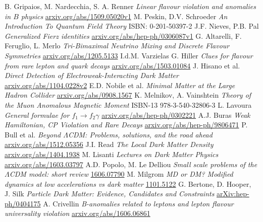 \begin{thebibliography}{xxx}
 B. Gripaios, M. Nardecchia, S. A. Renner \textit{Linear flavour violation and anomalies in $B$ physics} \href{http://arxiv.org/abs/1509.05020v1}{arxiv.org/abs/1509.05020v1}
 M. Peskin, D.V. Schroeder \textit{An Introduction To Quantum Field Theory} ISBN: 0-201-50397-2
 J.F. Nieves, P.B. Pal \textit{Generalized Fierz identities} \href{http://arxiv.org/abs/hep-ph/0306087v1}{arxiv.org/abs/hep-ph/0306087v1}
 G. Altarelli, F. Feruglio, L. Merlo \textit{Tri-Bimaximal Neutrino Mixing and Discrete Flavour Symmetries} \href{https://arxiv.org/abs/1205.5133}{arxiv.org/abs/1205.5133}
 I.d.M. Varzielas G. Hiller \textit{Clues for flavour from rare lepton and quark decays} \href{https://arxiv.org/abs/1503.01084}{arxiv.org/abs/1503.01084}
 J. Hisano et al. \textit{Direct Detection of Electroweak-Interacting Dark Matter} \href{https://arxiv.org/abs/1104.0228v2}{arxiv.org/abs/1104.0228v2}
 E.D. Nobile et al. \textit{Minimal Matter at the Large Hadron Collider} \href{http://arxiv.org/abs/0908.1567}{arxiv.org/abs/0908.1567}
 K. Melnikov, A. Vainshtein \textit{Theory of the Muon Anomalous Magnetic Moment} ISBN-13 978-3-540-32806-3
 L. Lavoura \textit{General formulae for $f_1\rightarrow f_2 \gamma$} \href{http://arxiv.org/abs/hep-ph/0302221}{arxiv.org/abs/hep-ph/0302221}
 A.J. Buras \textit{Weak Hamiltonian, CP Violation and Rare Decays} \href{http://arxiv.org/abs/hep-ph/9806471}{arxiv.org/abs/hep-ph/9806471}
 P. Bull et al. \textit{Beyond $\Lambda$CDM: Problems, solutions, and the road ahead} \href{http://arxiv.org/abs/1512.05356}{arxiv.org/abs/1512.05356}
 J.I. Read \textit{The Local Dark Matter Density} \href{http://arxiv.org/abs/1404.1938}{arxiv.org/abs/1404.1938}
 M. Lisanti \textit{Lectures on Dark Matter Physics} \href{https://arxiv.org/abs/1603.03797}{arxiv.org/abs/1603.03797}
 A.D. Popolo, M. Le Delliou \textit{Small scale problems of the $\Lambda$CDM model: short review} \href{https://arxiv.org/abs/1606.07790}{1606.07790}
 M. Milgrom \textit{MD or DM? Modified dynamics at low accelerations vs dark matter} \href{https://arxiv.org/abs/1101.5122}{1101.5122}
 G. Bertone, D. Hooper, J. Silk \textit{Particle Dark Matter: Evidence, Candidates and Constraints} \href{https://arxiv.org/abs/hep-ph/0404175}{arXiv:hep-ph/0404175}
 A. Crivellin \textit{B-anomalies related to leptons and lepton flavour universality violation} \href{https://arxiv.org/abs/1606.06861}{arxiv.org/abs/1606.06861}

\end{thebibliography}
